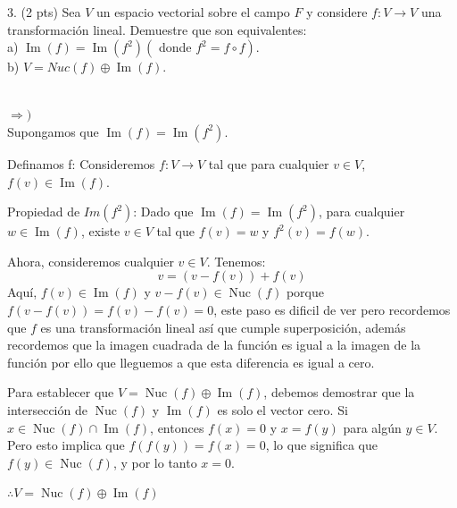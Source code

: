 3. (2 pts) Sea \( V \) un espacio vectorial sobre el campo \( F \) y considere \( f: V \rightarrow V \) una transformación lineal. Demuestre que son equivalentes: \\
a) \( \operatorname{Im}(f)=\operatorname{Im}\left(f^{2}\right)\left(\right. \) donde \( \left.f^{2}=f \circ f\right) \). \\
b) \( V=N u c(f) \oplus \operatorname{Im}(f) \). \\

\begin{solution} \\

$\Rightarrow )$\\
Supongamos que \( \operatorname{Im}(f) = \operatorname{Im}(f^2) \).


Definamos f: Consideremos \( f: V \rightarrow V \) tal que para cualquier \( v \in V \), \( f(v) \in \operatorname{Im}(f) \).


Propiedad de $Im(f^2)$: Dado que \( \operatorname{Im}(f) = \operatorname{Im}(f^2) \), para cualquier \( w \in \operatorname{Im}(f) \), existe \( v \in V \) tal que \( f(v) = w \) y \( f^2(v) = f(w) \).


Ahora, consideremos cualquier \( v \in V \). Tenemos:
\[
   v = (v - f(v)) + f(v)
   \]
Aquí, \( f(v) \in \operatorname{Im}(f) \) y \( v - f(v) \in \operatorname{Nuc}(f) \) porque \( f(v - f(v)) = f(v) - f(v) = 0 \), este paso es dificil de ver pero recordemos que $f$ es una transformación lineal así que cumple superposición, además recordemos que la imagen cuadrada de la función es igual a la imagen de la función por ello que lleguemos a que esta diferencia es igual a cero.


Para establecer que \( V = \operatorname{Nuc}(f) \oplus \operatorname{Im}(f) \), debemos demostrar que la intersección de \( \operatorname{Nuc}(f) \) y \( \operatorname{Im}(f) \) es solo el vector cero. Si \( x \in \operatorname{Nuc}(f) \cap \operatorname{Im}(f) \), entonces \( f(x) = 0 \) y \( x = f(y) \) para algún \( y \in V \). Pero esto implica que \( f(f(y)) = f(x) = 0 \), lo que significa que \( f(y) \in \operatorname{Nuc}(f) \), y por lo tanto \( x = 0 \).


\( \therefore V = \operatorname{Nuc}(f) \oplus \operatorname{Im}(f) \)
\quad\quad\quad\quad\quad\quad\quad\quad\quad\quad\quad\quad\quad\quad\quad\quad\quad\quad\quad\quad\quad\quad\quad\quad\quad\quad\quad\quad\quad\quad\quad\quad\quad\quad\quad \triangledown \\


\end{solution}
